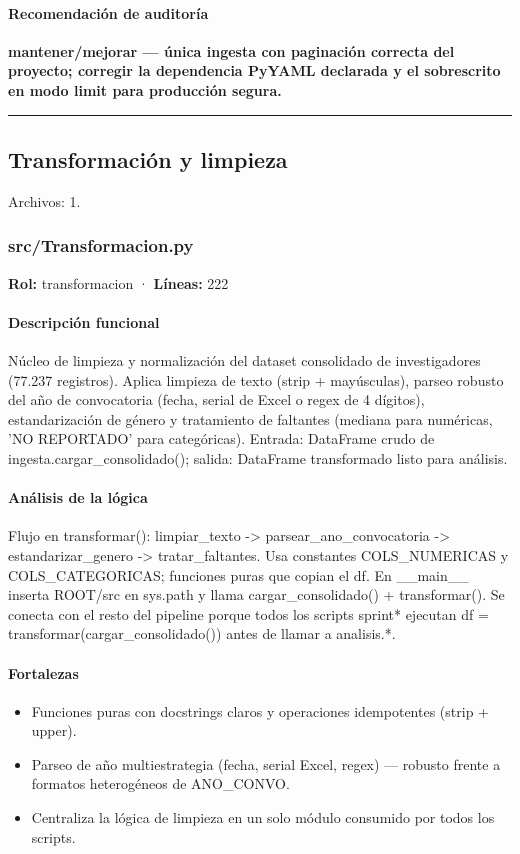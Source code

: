 \paragraph{Recomendación de auditoría}
\textbf{mantener/mejorar --- única ingesta con paginación correcta del proyecto; corregir la dependencia PyYAML declarada y el sobrescrito en modo limit para producción segura.}

\medskip
\hrule

\subsection{Transformación y limpieza}
\noindent Archivos: 1.

\subsubsection{src/Transformacion.py}
\textbf{Rol:} transformacion · \textbf{Líneas:} 222

\paragraph{Descripción funcional}
Núcleo de limpieza y normalización del dataset consolidado de investigadores (77.237 registros). Aplica limpieza de texto (strip + mayúsculas), parseo robusto del año de convocatoria (fecha, serial de Excel o regex de 4 dígitos), estandarización de género y tratamiento de faltantes (mediana para numéricas, 'NO REPORTADO' para categóricas). Entrada: DataFrame crudo de ingesta.cargar\_consolidado(); salida: DataFrame transformado listo para análisis.

\paragraph{Análisis de la lógica}
Flujo en transformar(): limpiar\_texto -> parsear\_ano\_convocatoria -> estandarizar\_genero -> tratar\_faltantes. Usa constantes COLS\_NUMERICAS y COLS\_CATEGORICAS; funciones puras que copian el df. En \_\_main\_\_ inserta ROOT/src en sys.path y llama cargar\_consolidado() + transformar(). Se conecta con el resto del pipeline porque todos los scripts sprint* ejecutan df = transformar(cargar\_consolidado()) antes de llamar a analisis.*.

\paragraph{Fortalezas}
\begin{itemize}
  \item Funciones puras con docstrings claros y operaciones idempotentes (strip + upper).
  \item Parseo de año multiestrategia (fecha, serial Excel, regex) --- robusto frente a formatos heterogéneos de ANO\_CONVO.
  \item Centraliza la lógica de limpieza en un solo módulo consumido por todos los scripts.
\end{itemize}

